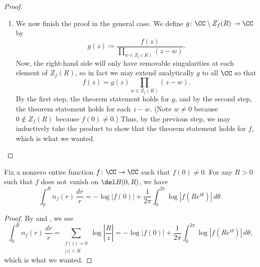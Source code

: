 \documentclass[notes.tex]{subfiles}
\begin{document}
\begin{proof}
\begin{enumerate}
		\item We now finish the proof in the general case. We define $g\colon\CC\setminus Z_f(R)\to\CC$ by
		\[g(z)\coloneqq\frac{f(z)}{\prod_{w\in Z_f(R)}(z-w)}.\]
		Now, the right-hand side will only have removable singularities at each element of $Z_f(R)$, so in fact we may extend analytically $g$ to all $\CC$ so that
		\[f(z)=g(z)\prod_{w\in Z_f(R)}(z-w).\]
		By the first step, the theorem statement holds for $g$, and by the second step, the theorem statement holds for each $z-w$. (Note $w\ne0$ because $0\notin Z_f(R)$ because $f(0)\ne0$.) Thus, by the previous step, we may inductively take the product to show that the theorem statement holds for $f$, which is what we wanted.
		\qedhere
	\end{enumerate}
\end{proof}
\begin{corollary} \label{cor:roughly-count-zeroes}
	Fix a nonzero entire function $f\colon\CC\to\CC$ such that $f(0)\ne0$. For any $R>0$ such that $f$ does not vanish on $\del B(0,R)$, we have
	\[\int_0^Rn_f(r)\,\frac{dr}r=-\log|f(0)|+\frac1{2\pi}\int_0^{2\pi}\log\left|f\left(Re^{i\theta}\right)\right|\,d\theta.\]
\end{corollary}
\begin{proof}
	By  and , we see
	\[\int_0^Rn_f(r)\,\frac{dr}r=\sum_{\substack{f(z)=0\\|z|<R}}\log\left|\frac Rz\right|=-\log|f(0)|+\frac1{2\pi}\int_0^{2\pi}\log\left|f\left(Re^{i\theta}\right)\right|\,d\theta,\]
	which is what we wanted.
\end{proof}
\end{document}

